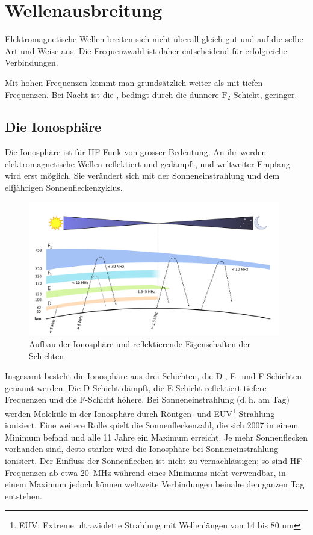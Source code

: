 
\chapter{Wellenausbreitung}\label{sec:wellenausbreitung}
Elektromagnetische Wellen breiten sich nicht überall gleich gut und auf die selbe Art und Weise aus. Die Frequenzwahl ist daher entscheidend für erfolgreiche Verbindungen.

Mit hohen Frequenzen kommt man grundsätzlich weiter als mit tiefen Frequenzen. Bei Nacht ist die , bedingt durch die dünnere $\mathrm F_2$-Schicht, geringer.

\section{Die Ionosphäre}
Die Ionosphäre ist für HF-Funk von grosser Bedeutung. An ihr werden elektromagnetische Wellen reflektiert und gedämpft, und weltweiter Empfang wird erst möglich. Sie verändert sich mit der Sonneneinstrahlung und dem elfjährigen Sonnenfleckenzyklus.

\begin{figure}[h!]
 \centering
 \includegraphics[width=11cm]{./png/Amfu-Ionosphere.png}
 \caption{Aufbau der Ionosphäre und reflektierende Eigenschaften der Schichten}
 \label{fig:ionosphere}
\end{figure}


Insgesamt besteht die Ionosphäre aus drei Schichten, die D-, E- und F-Schichten genannt werden. Die D-Schicht dämpft, die E-Schicht reflektiert tiefere Frequenzen und die F-Schicht höhere. Bei Sonneneinstrahlung (d. h. am Tag) werden Moleküle in der Ionosphäre durch Röntgen- und EUV\footnote{EUV: Extreme ultraviolette Strahlung mit Wellenlängen von 14 bis 80 nm}-Strahlung ionisiert. Eine weitere Rolle spielt die Sonnenfleckenzahl, die sich 2007 in einem Minimum befand und alle 11 Jahre ein Maximum erreicht. Je mehr Sonnenflecken vorhanden sind, desto stärker wird die Ionosphäre bei Sonneneinstrahlung ionisiert. Der Einfluss der Sonnenflecken ist nicht zu vernachlässigen; so sind HF-Frequenzen ab etwa 20 MHz während eines Minimums nicht verwendbar, in einem Maximum jedoch können weltweite Verbindungen beinahe den ganzen Tag entstehen.

